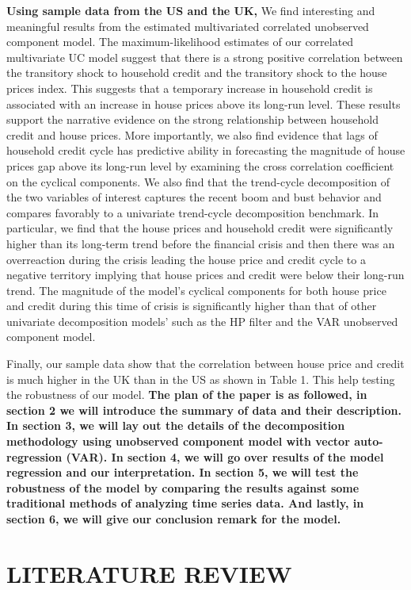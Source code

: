 \documentclass[
  12pt,
]{article}
\begin{document}
\textbf{Using sample data from the US and the UK,} We find interesting and meaningful results from the estimated multivariated correlated unobserved component model. The maximum-likelihood estimates of our correlated multivariate UC model suggest that there is a strong positive correlation between the transitory shock to household credit and the transitory shock to the house prices index. This suggests that a temporary increase in household credit is associated with an increase in house prices above its long-run level. These results support the narrative evidence on the strong relationship between household credit and house prices. More importantly, we also find evidence that lags of household credit cycle has predictive ability in forecasting the magnitude of house prices gap above its long-run level by examining the cross correlation coefficient on the cyclical components. We also find that the trend-cycle decomposition of the two variables of interest captures the recent boom and bust behavior and compares favorably to a univariate trend-cycle decomposition benchmark. In particular, we find that the house prices and household credit were significantly higher than its long-term trend before the financial crisis and then there was an overreaction during the crisis leading the house price and credit cycle to a negative territory implying that house prices and credit were below their long-run trend. The magnitude of the model's cyclical components for both house price and credit during this time of crisis is significantly higher than that of other univariate decomposition models' such as the HP filter and the VAR unobserved component model.

Finally, our sample data show that the correlation between house price and credit is much higher in the UK than in the US as shown in Table 1. This help testing the robustness of our model. \textbf{The plan of the paper is as followed, in section 2 we will introduce the summary of data and their description. In section 3, we will lay out the details of the decomposition methodology using unobserved component model with vector auto-regression (VAR). In section 4, we will go over results of the model regression and our interpretation. In section 5, we will test the robustness of the model by comparing the results against some traditional methods of analyzing time series data. And lastly, in section 6, we will give our conclusion remark for the model.}

\hypertarget{literature-review}{%
\section{LITERATURE REVIEW}\label{literature-review}}
\end{document}
